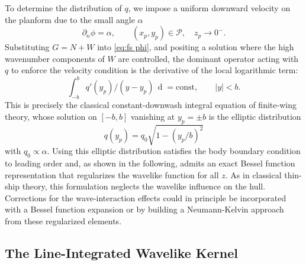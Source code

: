 \documentclass[]{JFM-FLM_Au}
\newcommand{\di}[1]{\mathop{\mathrm{d}#1}} %
\begin{document}
To determine the distribution of $q$, we impose a uniform downward velocity on the planform due to the small angle $\alpha$
\[
\partial_n\phi = \alpha, \qquad (x_p,y_p)\in\mathcal{P},\quad z_p\to 0^-.
\]
Substituting $G = N + W$ into \eqref{eq:fs phi}, and positing a solution where the high wavenumber components of $W$ are controlled, the dominant operator acting with $q$ to enforce the velocity condition is the derivative of the local logarithmic term:
\[
\int_{-b}^{b} q'(y_p)/(y-y_p)\,\di{y_p} = \mathrm{const},\qquad |y|<b.
\]
This is precisely the classical constant-downwash integral equation of finite-wing theory, whose solution on $[-b,b]$ vanishing at $y_p=\pm b$ is the elliptic distribution
\begin{equation}\label{eq:elliptic}
q(y_p) = q_0\sqrt{1-(y_p/b)^2}    
\end{equation}
with $q_0 \propto \alpha$. Using this elliptic distribution satisfies the body boundary condition to leading order and, as shown in the following, admits an exact Bessel function representation that regularizes the wavelike function for all $z$. As in classical thin-ship theory, this formulation neglects the wavelike influence on the hull. Corrections for the wave-interaction effects could in principle be incorporated with a Bessel function expansion or by building a Neumann-Kelvin approach from these regularized elements.

\subsection{The Line-Integrated Wavelike Kernel}
\end{document}
